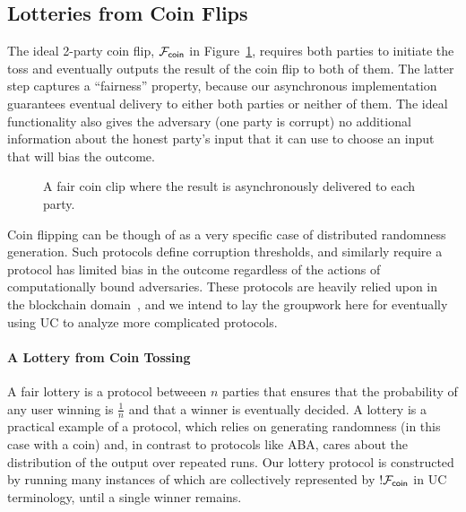 \subsection{Lotteries from Coin Flips}
The ideal 2-party coin flip, $\mathcal{F}_{{\mathsf {coin}}}$ in Figure~\ref{fig:fcoin}, requires both parties to
initiate the toss and eventually outputs the result of the coin flip to both
of them.  The latter step captures a ``fairness'' property, because our
asynchronous implementation guarantees eventual delivery to either both parties or neither of
them.  The ideal functionality also gives the adversary (one party is corrupt) no additional
information about the honest party's input that it can use to choose an input that will bias the outcome.

\begin{figure}
\centering

\caption{A fair coin clip where the result is asynchronously delivered to each party.}
\label{fig:fcoin}
\end{figure}

Coin flipping can be though of as a very specific case of distributed randomness generation.
Such protocols define corruption thresholds, and similarly require a protocol has limited
bias in the outcome regardless of the actions of computationally bound adversaries.
These protocols are heavily relied upon in the blockchain domain~\cite{ran, dao}, and we intend to lay
the groupwork here for eventually using UC to analyze more complicated protocols.


\paragraph{A Lottery from Coin Tossing}
A fair lottery is a protocol betweeen $n$ parties that ensures that the
probability of any user winning is $\frac{1}{n}$ and that a winner is
eventually decided. A lottery is a practical example of a protocol,
which relies on generating randomness (in this case with a coin) and, 
in contrast to protocols like ABA, cares about the distribution of the output over repeated runs.
Our lottery protocol is constructed by running many instances of \Fcoin which are collectively represented by $!\mathcal{F}_{{\mathsf {coin}}}$ in UC terminology, until a single winner remains.


